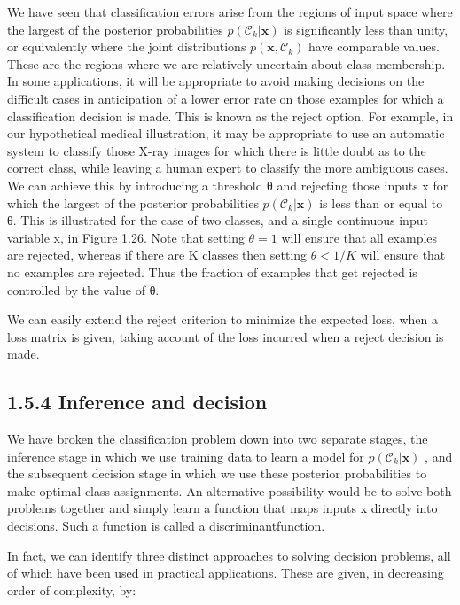 \documentclass[
  10
]{article}
\begin{document}
We have seen that classification errors arise from the regions of input
space where the largest of the posterior probabilities
\(p ( \mathcal { C } _ { k } \vert \mathbf { x } )\) is significantly
less than unity, or equivalently where the joint distributions
\(p ( \mathbf { x } , \mathcal { C } _ { k } )\) have comparable values.
These are the regions where we are relatively uncertain about class
membership. In some applications, it will be appropriate to avoid making
decisions on the difficult cases in anticipation of a lower error rate
on those examples for which a classification decision is made. This is
known as the reject option. For example, in our hypothetical medical
illustration, it may be appropriate to use an automatic system to
classify those X-ray images for which there is little doubt as to the
correct class, while leaving a human expert to classify the more
ambiguous cases. We can achieve this by introducing a threshold θ and
rejecting those inputs x for which the largest of the posterior
probabilities \(p ( \mathcal { C } _ { k } \vert \mathbf { x } )\) is
less than or equal to θ. This is illustrated for the case of two
classes, and a single continuous input variable x, in Figure 1.26. Note
that setting \(\theta = 1\) will ensure that all examples are rejected,
whereas if there are K classes then setting \(\theta < 1 / K\) will
ensure that no examples are rejected. Thus the fraction of examples that
get rejected is controlled by the value of θ.

We can easily extend the reject criterion to minimize the expected loss,
when a loss matrix is given, taking account of the loss incurred when a
reject decision is made.

\subsection{1.5.4 Inference and decision}\label{inference-and-decision}

We have broken the classification problem down into two separate stages,
the inference stage in which we use training data to learn a model for
\(p ( \mathcal { C } _ { k } \vert \mathbf { x } )\) , and the
subsequent decision stage in which we use these posterior probabilities
to make optimal class assignments. An alternative possibility would be
to solve both problems together and simply learn a function that maps
inputs x directly into decisions. Such a function is called a
discriminantfunction.

In fact, we can identify three distinct approaches to solving decision
problems, all of which have been used in practical applications. These
are given, in decreasing order of complexity, by:
\end{document}
